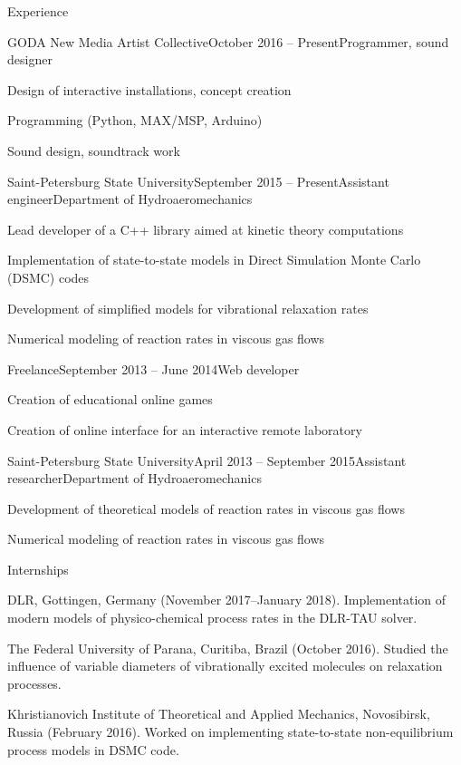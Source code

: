 \documentclass{resume} %
\begin{document}

\begin{rSection}{Experience}


\begin{rSubsection}{GODA New Media Artist Collective}{October 2016 -- Present}{Programmer, sound designer}{}
\item Design of interactive installations, concept creation
\item Programming (Python, MAX/MSP, Arduino)
\item Sound design, soundtrack work
\end{rSubsection}

\begin{rSubsection}{Saint-Petersburg State University}{September 2015 -- Present}{Assistant engineer}{Department of Hydroaeromechanics}
\item Lead developer of a C++ library aimed at kinetic theory computations
\item Implementation of state-to-state models in Direct Simulation Monte Carlo (DSMC) codes
\item Development of simplified models for vibrational relaxation rates
\item Numerical modeling of reaction rates in viscous gas flows
\end{rSubsection}

\begin{rSubsection}{Freelance}{September 2013 -- June 2014}{Web developer}{}
\item Creation of educational online games
\item Creation of online interface for an interactive remote laboratory
\end{rSubsection}

\begin{rSubsection}{Saint-Petersburg State University}{April 2013 -- September 2015}{Assistant researcher}{Department of Hydroaeromechanics}
\item Development of theoretical models of reaction rates in viscous gas flows
\item Numerical modeling of reaction rates in viscous gas flows
\end{rSubsection}

\begin{rSubsection}{Internships}{}{}{}
\item DLR, Gottingen, Germany (November 2017--January 2018). Implementation of modern models of physico-chemical process rates in the DLR-TAU solver.
\item The Federal University of Parana, Curitiba, Brazil (October 2016). Studied the influence of variable diameters of vibrationally excited molecules on relaxation processes.
\item Khristianovich Institute of Theoretical and Applied Mechanics, Novosibirsk, Russia (February 2016). Worked on implementing state-to-state non-equilibrium process models in DSMC code.
\end{rSubsection}


\end{rSection}
\end{document}
